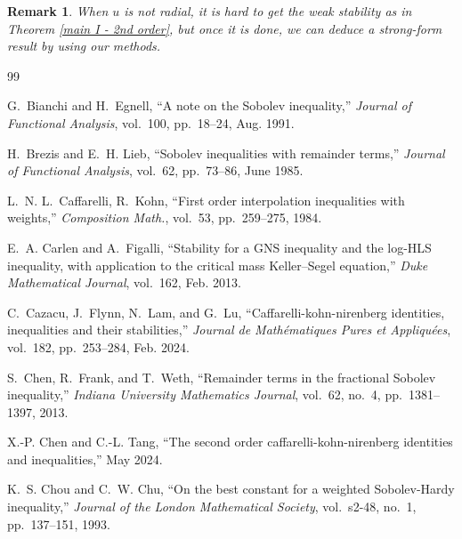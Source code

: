 \documentclass[11pt]{article}
\newtheorem{remark}[theorem]{Remark}
\numberwithin{equation}{section}
\begin{document}
\begin{remark}
    When $u$ is not radial, it is hard to get the weak stability as in Theorem \ref{main I - 2nd order}, but once it is done, we can deduce a strong-form result by using our methods.
\end{remark}




%


\begin{thebibliography}{99}



G.~Bianchi and H.~Egnell, ``A note on the {Sobolev} inequality,'' {\em Journal
  of Functional Analysis}, vol.~100, pp.~18--24, Aug. 1991.



H.~Brezis and E.~H. Lieb, ``{Sobolev} inequalities with remainder terms,'' {\em
  Journal of Functional Analysis}, vol.~62, pp.~73--86, June 1985.



L.~N. L.~Caffarelli, R.~Kohn, ``First order interpolation inequalities with
  weights,'' {\em Composition Math.}, vol.~53, pp.~259--275, 1984.



E.~A. Carlen and A.~Figalli, ``Stability for a {GNS} inequality and the
  log-{HLS} inequality, with application to the critical mass {Keller--Segel}
  equation,'' {\em Duke Mathematical Journal}, vol.~162, Feb. 2013.





C.~Cazacu, J.~Flynn, N.~Lam, and G.~Lu, ``Caffarelli-kohn-nirenberg identities,
  inequalities and their stabilities,'' {\em Journal de Math{\'e}matiques Pures
  et Appliqu{\'e}es}, vol.~182, pp.~253--284, Feb. 2024.


S.~Chen, R.~Frank, and T.~Weth, ``Remainder terms in the fractional {Sobolev}
  inequality,'' {\em Indiana University Mathematics Journal}, vol.~62, no.~4,
  pp.~1381--1397, 2013.

 X.-P. Chen and C.-L. Tang, ``The second order caffarelli-kohn-nirenberg
  identities and inequalities,'' May 2024.


K.~S. Chou and C.~W. Chu, ``On the best constant for a weighted {Sobolev-Hardy}
  inequality,'' {\em Journal of the London Mathematical Society}, vol.~s2-48,
  no.~1, pp.~137--151, 1993.



\end{thebibliography}
\end{document}
